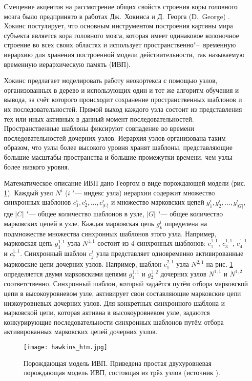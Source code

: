 Смещение акцентов на рассмотрение общих свойств строения коры головного мозга было предпринято в работах Дж.~Хокинса и Д.~Георга (D.~George) \cite{George2005,Hawkins2009}. Хокинс постулирует, что основным инструментом построения картины мира субъекта является кора головного мозга, которая имеет одинаковое колоночное строение во всех своих областях и использует пространственно"--~временную иерархию для хранения построенной модели действительности, так называемую временную иерархическую память (ИВП).

Хокинс предлагает моделировать работу неокортекса с помощью узлов, организованных в дерево и использующих один и тот же алгоритм обучения и вывода, за счёт которого происходит сохранение пространственных шаблонов и их последовательностей. Прямой выход каждого узла состоит из представления тех или иных активных в данный момент последовательностей. Пространственные шаблоны фиксируют совпадение во времени последовательностей дочерних узлов. Иерархия узлов организована таким образом, что узлы более высокого уровня хранят шаблоны, представляющие большие масштабы пространства и большие промежутки времени, чем узлы более низкого уровня.

Математическое описание ИВП дано Георгом в виде порождающей модели (рис. \ref{fg:hawkins_htm}). Каждый узел $N^i$ ($i$ "--- индекс узла) иерархии содержит множество синхронных шаблонов $c_1^i, c_2^i,\dots,c_{|C|}^i$ и множество марковских цепей $g_1^i,g_2^i,\dots,g_{|G|}^i$, где $|C|$ "--- общее количество шаблонов в узле, $|G|$ "--- общее количество марковских цепей в узле. Каждая марковская цепь $g_k^i$ определена на подмножестве множества синхронных шаблонов этого узла. Например, марковская цепь $g_1^{1,1}$ узла $N^{1,1}$ состоит из $4$ синхронных шаблонов: $c_1^{1,1}$, $c_3^{1,1}$, $c_4^{1,1}$ и $c_7^{1,1}$. Синхронный шаблон $c_j^i$ узла представляет одновременно активированные марковские цепи дочерних узлов. Например, шаблон $c_1^{2,1}$ узла $N^{2,1}$ на рис. \ref{fg:hawkins_htm} определяется двумя марковскими цепями $g_1^{1,1}$ и $g_2^{1,2}$ дочерних узлов $N^{1,1}$ и $N^{1,2}$ соответственно. Синхронный шаблон, который задаётся путём отбора марковской цепи в высокоуровневом узле, активирует свои составляющие марковские цепи низкоуровневых дочерних узлов. Для конкретных синхронного шаблона и марковской цепи, которая активна в высокоуровневом узле, задаются конкурирующие последовательности синхронных шаблонов путём отбора активированных марковских цепей дочерних узлов.

\begin{figure}[h]
	\centering
	\texttt{[image: hawkins\_htm.jpg]}
	\caption{Порождающая модель ИВП. Приведена простая двухуровневая порождающая модель ИВП, состоящая из трёх узлов (источник \cite{Hawkins2009}).}
	\label{fg:hawkins_htm}
\end{figure}

